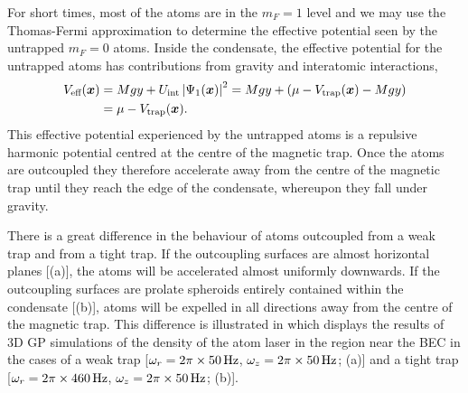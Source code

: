 For short times, most of the atoms are in the $m_F=1$ level and we may use the Thomas-Fermi approximation to determine the effective potential seen by the untrapped $m_F=0$ atoms.  Inside the condensate, the effective potential for the untrapped atoms has contributions from gravity and interatomic interactions,
\begin{align}
    V_\text{eff}(\bm{x}) &= M g y + U_\text{int} \left|\Psi_1(\bm{x})\right|^2 = M g y + \left(\mu - V_\text{trap}(\bm{x}) - M g y \right) \notag\\
    &= \mu - V_\text{trap}(\bm{x}).
\end{align}
This effective potential experienced by the untrapped atoms is a repulsive harmonic potential centred at the centre of the magnetic trap.  Once the atoms are outcoupled they therefore accelerate away from the centre of the magnetic trap until they reach the edge of the condensate, whereupon they fall under gravity.

There is a great difference in the behaviour of atoms outcoupled from a weak trap and from a tight trap.  If the outcoupling surfaces are almost horizontal planes [(a)], the atoms will be accelerated almost uniformly downwards.  If the outcoupling surfaces are prolate spheroids entirely contained within the condensate [(b)], atoms will be expelled in all directions away from the centre of the magnetic trap.  This difference is illustrated in  which displays the results of 3D GP simulations of the density of the atom laser in the region near the BEC in the cases of a weak trap [$\omega_r = 2\pi \times \unit[50]{Hz}$, $\omega_z = 2\pi \times\unit[50]{Hz}$; (a)] and a tight trap [$\omega_r = 2 \pi \times \unit[460]{Hz}$, $\omega_z = 2\pi \times \unit[50]{Hz}$; (b)].  

